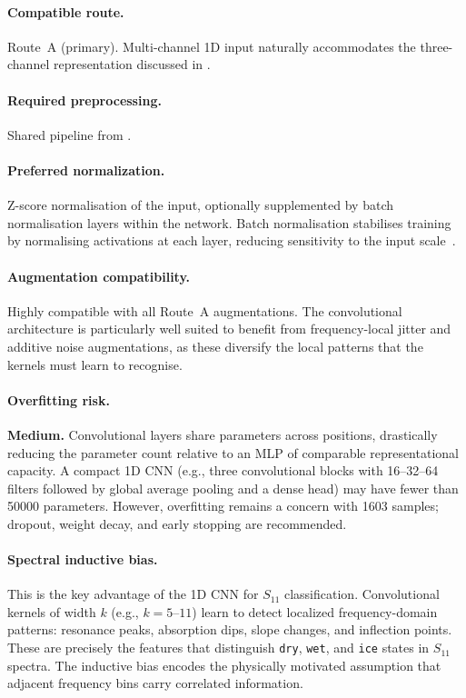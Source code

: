 \paragraph{Compatible route.}
Route~A (primary).  Multi-channel 1D input naturally accommodates
the three-channel representation discussed in .

\paragraph{Required preprocessing.}
Shared pipeline from .

\paragraph{Preferred normalization.}
Z-score normalisation of the input, optionally supplemented by batch
normalisation layers within the network.  Batch normalisation
stabilises training by normalising activations at each layer,
reducing sensitivity to the input scale~\cite{goodfellow2016deep}.

\paragraph{Augmentation compatibility.}
Highly compatible with all Route~A augmentations.  The convolutional
architecture is particularly well suited to benefit from frequency-local
jitter and additive noise augmentations, as these diversify the
local patterns that the kernels must learn to recognise.

\paragraph{Overfitting risk.}
\textbf{Medium.}  Convolutional layers share parameters across
positions, drastically reducing the parameter count relative to an
MLP of comparable representational capacity.  A compact 1D CNN
(e.g., three convolutional blocks with 16--32--64 filters followed by
global average pooling and a dense head) may have fewer than
\num{50000} parameters.  However, overfitting remains a concern with
\num{1603} samples; dropout, weight decay, and early stopping are
recommended.

\paragraph{Spectral inductive bias.}
This is the key advantage of the 1D CNN for $S_{11}$ classification.
Convolutional kernels of width $k$ (e.g., $k = 5$--$11$) learn to
detect localized frequency-domain patterns: resonance peaks,
absorption dips, slope changes, and inflection points.  These are
precisely the features that distinguish \texttt{dry}, \texttt{wet},
and \texttt{ice} states in $S_{11}$ spectra.  The inductive bias
encodes the physically motivated assumption that adjacent frequency
bins carry correlated information.

